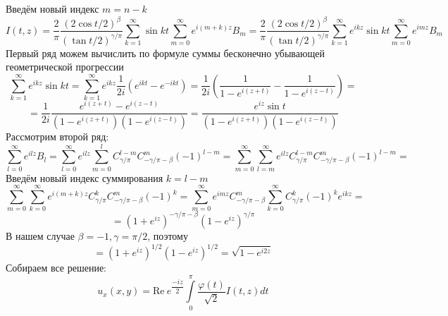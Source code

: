 \documentclass[12pt, a4paper]{article}
\begin{document}
	Введём новый индекс $m = n - k$
	\begin{equation*}
		I(t,z) = \dfrac{2}{\pi}\dfrac{(2\cos{t/2})^\beta}{(\tan{t/2})^{\gamma/\pi}} \sum\limits_{k=1}^{\infty} \sin{kt} \sum\limits_{m =0 }^{\infty} e^{i(m+k)z} B_{m} = 
		\dfrac{2}{\pi}\dfrac{(2\cos{t/2})^\beta}{(\tan{t/2})^{\gamma/\pi}} \sum\limits_{k=1}^{\infty} e^{ikz}\sin{kt} \sum\limits_{m =0 }^{\infty} e^{imz} B_{m}
	\end{equation*}
	Первый ряд можем вычислить по формуле суммы бесконечно убывающей геометрической прогрессии
	\begin{equation*}
		\sum\limits_{k=1}^{\infty} e^{ikz}\sin{kt} =  \sum\limits_{k=1}^{\infty} e^{ikz}\dfrac{1}{2i}\left(e^{ikt} - e^{-ikt}\right) = \dfrac1{2i} \left(\dfrac{1}{1 - e^{i(z+t)}} -  \dfrac{1}{1 - e^{i(z-t)}}\right) = 
	\end{equation*}
	\begin{equation*}
		= \dfrac{1}{2i}  \dfrac{e^{i(z+t)} - e^{i(z-t)}}{\left(1 - e^{i(z+t)} \right) \left(1 - e^{i(z-t)}\right)} =  \dfrac{e^{iz} \sin{t}}{\left(1 - e^{i(z+t)} \right) \left(1 - e^{i(z-t)}\right)}
	\end{equation*}
	Рассмотрим второй ряд:
	\begin{equation*}
		\sum\limits_{l =0 }^{\infty} e^{ilz} B_{l} = \sum\limits_{l =0 }^{\infty} e^{ilz} \sum\limits_{m=0}^{l} C^{l - m}_{\gamma/\pi} C^{m}_{-\gamma/\pi - \beta} (-1)^{l-m} = \sum\limits_{m=0}^{\infty} \sum\limits_{l=m}^{\infty} e^{ilz} C^{l - m}_{\gamma/\pi} C^{m}_{-\gamma/\pi - \beta} (-1)^{l-m} = 
	\end{equation*}
	Введём новый индекс суммирования $k = l -m$
	\begin{equation*}
		\sum\limits_{m=0}^{\infty} \sum\limits_{k=0}^{\infty} e^{i(m+k)z} C^{k}_{\gamma/\pi} C^{m}_{-\gamma/\pi - \beta} (-1)^{k} = \sum\limits_{m=0}^{\infty} e^{imz} C^{m}_{-\gamma/\pi - \beta} \sum\limits_{k=0}^{\infty}  C^{k}_{\gamma/\pi} (-1)^k e^{ikz} = 
	\end{equation*}
	\begin{equation*}
		= (1 + e^{iz})^{-\gamma/\pi - \beta} (1- e^{iz})^{\gamma/\pi} 
	\end{equation*}
	В нашем случае $\beta = -1, \gamma = \pi/2$, поэтому
	\begin{equation*}
		= (1 + e^{iz})^{1/2} (1- e^{iz})^{1/2} =\sqrt{1 - e^{i2z}} 
	\end{equation*}
	Собираем все решение:
	\begin{equation*}
		u_x(x,y) = \mathrm{Re} \ e^{\dfrac{-iz}{2}} \int\limits_0^\pi \dfrac{\varphi(t)}{\sqrt2} I(t,z) dt 
	\end{equation*}
\end{document}
